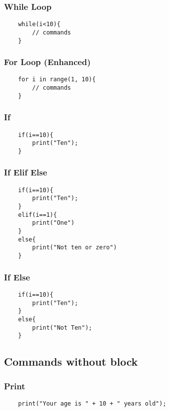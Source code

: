 \documentclass[12pt,letterpaper]{article}
\begin{document}
\subsubsection{While Loop}
\begin{verbatim}
    while(i<10){
        // commands
    }
\end{verbatim}

\subsubsection{For Loop (Enhanced)}
\begin{verbatim}
    for i in range(1, 10){
        // commands
    }
\end{verbatim}

\subsubsection{If}
\begin{verbatim}
    if(i==10){
        print("Ten");
    }
\end{verbatim}

\subsubsection{If Elif Else}
\begin{verbatim}
    if(i==10){
        print("Ten");
    }
    elif(i==1){
        print("One")
    }
    else{
        print("Not ten or zero")
    }
\end{verbatim}

\subsubsection{If Else}
\begin{verbatim}
    if(i==10){
        print("Ten");
    }
    else{
        print("Not Ten");
    }
\end{verbatim}

\subsection{Commands without block}
\subsubsection{Print}
\begin{verbatim}
    print("Your age is " + 10 + " years old");
\end{verbatim}
\end{document}
